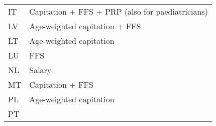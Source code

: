 \documentclass[ngerman,a4paper]{article}
\begin{document}
\begin{longtable}[c]{@{}ll@{}}
\begin{minipage}[t]{0.08\columnwidth}\raggedright\strut
IT
\strut\end{minipage} &
\begin{minipage}[t]{0.86\columnwidth}\raggedright\strut
Capitation + FFS + PRP (also for paediatricians)
\strut\end{minipage}\tabularnewline
\begin{minipage}[t]{0.08\columnwidth}\raggedright\strut
LV
\strut\end{minipage} &
\begin{minipage}[t]{0.86\columnwidth}\raggedright\strut
Age-weighted capitation + FFS
\strut\end{minipage}\tabularnewline
\begin{minipage}[t]{0.08\columnwidth}\raggedright\strut
LT
\strut\end{minipage} &
\begin{minipage}[t]{0.86\columnwidth}\raggedright\strut
Age-weighted capitation
\strut\end{minipage}\tabularnewline
\begin{minipage}[t]{0.08\columnwidth}\raggedright\strut
LU
\strut\end{minipage} &
\begin{minipage}[t]{0.86\columnwidth}\raggedright\strut
FFS
\strut\end{minipage}\tabularnewline
\begin{minipage}[t]{0.08\columnwidth}\raggedright\strut
NL
\strut\end{minipage} &
\begin{minipage}[t]{0.86\columnwidth}\raggedright\strut
Salary
\strut\end{minipage}\tabularnewline
\begin{minipage}[t]{0.08\columnwidth}\raggedright\strut
MT
\strut\end{minipage} &
\begin{minipage}[t]{0.86\columnwidth}\raggedright\strut
Capitation + FFS
\strut\end{minipage}\tabularnewline
\begin{minipage}[t]{0.08\columnwidth}\raggedright\strut
PL
\strut\end{minipage} &
\begin{minipage}[t]{0.86\columnwidth}\raggedright\strut
Age-weighted capitation
\strut\end{minipage}\tabularnewline
\begin{minipage}[t]{0.08\columnwidth}\raggedright\strut
PT
\strut\end{minipage} &

\end{longtable}
\end{document}
